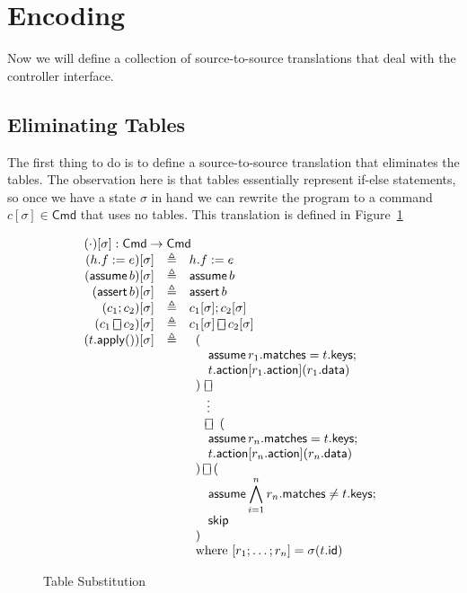 \documentclass{article}
\newcommand{\Cmd}{\mathsf{Cmd}}
\newcommand{\matches}{\mathsf{matches}}
\newcommand{\action}{\mathsf{action}}
\newcommand{\keys}{\mathsf{keys}}
\newcommand{\data}{\mathsf{data}}
\newcommand{\id}{\mathsf{id}}
\newcommand{\assert}{\mathop{\mathsf{assert}}}
\newcommand{\assume}{\mathop{\mathsf{assume}}}
\newcommand{\apply}{\mathsf{apply}}
\newcommand{\choiceop}{\rotatebox[origin=c]{90}{$\sqsubset\!\!\!\sqsupset$}}
\newcommand{\choice}{\mathbin{\choiceop}}
\newcommand{\SKIP}{\mathsf{skip}}
\begin{document}
\section{Encoding}

Now we will define a collection of source-to-source translations that deal with
the controller interface.

\subsection{Eliminating Tables}

The first thing to do is to define a source-to-source translation that
eliminates the tables. The observation here is that tables essentially represent
if-else statements, so once we have a state $\sigma$ in hand we can rewrite the
program to a command $c[\sigma] \in \Cmd$ that uses no tables. This translation
is defined in Figure~\ref{fig:table-elim}

\begin{figure}
  \[\begin{array}{r>{\triangleq}cl}
  \multicolumn{3}{l}{(\cdot)[\sigma] : \Cmd \to \Cmd} \\
  (h.f := e)[\sigma] && h.f := e   \\
  (\assume b)[\sigma] && \assume b \\
  (\assert b)[\sigma] && \assert b \\
  (c_1;c_2)[\sigma] && c_1[\sigma];c_2[\sigma] \\
  (c_1 \choice c_2)[\sigma] && c_1[\sigma] \choice c_2[\sigma] \\
  (t.\apply())[\sigma] &&
  \begin{array}[t]{l}
    (\\
    \quad \assume {r_1.\matches = t.\keys};\\
    \quad t.\action[r_1.\action](r_1.\data)\\
    )~\choice\\
    \phantom)~\,\vdots\\
    \phantom)\,\choice~(\\
    \quad \assume {r_n.\matches = t.\keys};\\
    \quad t.\action[r_n.\action](r_n.\data)\\
    )\choice (\\
    \quad \displaystyle \assume {\bigwedge_{i=1}^n r_n.\matches \neq t.\keys};\\
    \quad \SKIP \\
    )\\
    \textrm{where}~[r_1;\ldots;r_n] = \sigma(t.\id)
  \end{array}
  \end{array}
  \]
  \caption{Table Substitution}
  \label{fig:table-elim}
\end{figure}
\end{document}
